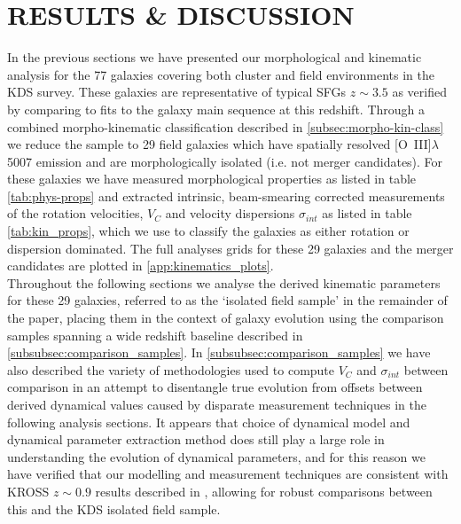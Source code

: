 \documentclass[fleqn,usenatbib]{mn2e}
\begin{document}
\section{RESULTS \& DISCUSSION}\label{sec:results}

In the previous sections we have presented our morphological and kinematic analysis for the 77 galaxies covering both cluster and field environments in the KDS survey.
These galaxies are representative of typical SFGs $z\sim3.5$ as verified by comparing to fits to the galaxy main sequence at this redshift.
Through a combined morpho-kinematic classification described in \cref{subsec:morpho-kin-class} we reduce the sample to 29 field galaxies which have spatially resolved [O~{\sc III}]$\lambda$5007 emission and are morphologically isolated (i.e. not merger candidates).
For these galaxies we have measured morphological properties as listed in table \ref{tab:phys-props} and extracted intrinsic, beam-smearing corrected measurements of the rotation velocities, $V_{C}$ and velocity dispersions $\sigma_{int}$ as listed in table \ref{tab:kin_props}, which we use to classify the galaxies as either rotation or dispersion dominated.
The full analyses grids for these 29 galaxies and the merger candidates are plotted in \cref{app:kinematics_plots}. \\

Throughout the following sections we analyse the derived kinematic parameters for these 29 galaxies, referred to as the `isolated field sample' in the remainder of the paper, placing them in the context of galaxy evolution using the comparison samples spanning a wide redshift baseline described in \cref{subsubsec:comparison_samples}.
In \cref{subsubsec:comparison_samples} we have also described the variety of methodologies used to compute $V_{C}$ and $\sigma_{int}$ between comparison in an attempt to disentangle true evolution from offsets between derived dynamical values caused by disparate measurement techniques in the following analysis sections.
It appears that choice of dynamical model and dynamical parameter extraction method does still play a large role in understanding the evolution of dynamical parameters, and for this reason we have verified that our modelling and measurement techniques are consistent with KROSS $z\sim0.9$ results described in \cite{Harrison2017}, allowing for robust comparisons between this and the KDS isolated field sample. 
\end{document}
